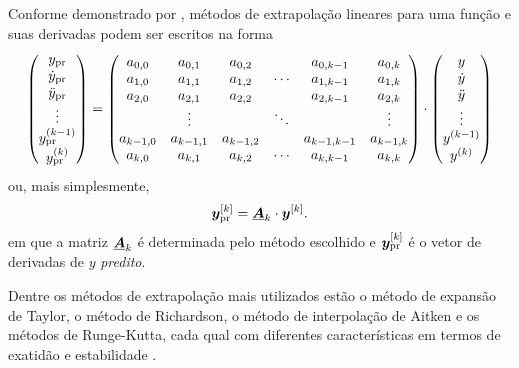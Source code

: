 Conforme demonstrado por , métodos de extrapolação lineares para uma função e suas derivadas podem ser escritos na forma
\begin{equation*}
	\begin{pmatrix}
		\predicted{y} \\
		\predicted{\deriv{1}{y}} \\
		\predicted{\deriv{2}{y}} \\
		\vdots \\
		\predicted{\deriv{\taylorOrder-1}{y}} \\
		\predicted{\deriv{\taylorOrder}{y}}
	\end{pmatrix}
	=
	\begin{pmatrix}
		a_{0,0} & a_{0,1} & a_{0,2} &  & a_{0,\taylorOrder-1} & a_{0,\taylorOrder} \\
		a_{1,0} & a_{1,1} & a_{1,2} & \cdots & a_{1,\taylorOrder-1} & a_{1,\taylorOrder} \\
		a_{2,0} & a_{2,1} & a_{2,2} &  & a_{2,\taylorOrder-1} & a_{2,\taylorOrder} \\
	     & \vdots & & \ddots & & \vdots \\
	    a_{\taylorOrder-1,0} & a_{\taylorOrder-1,1} & a_{\taylorOrder-1,2} &  & a_{\taylorOrder-1,\taylorOrder-1} & a_{\taylorOrder-1,\taylorOrder} \\
	    a_{\taylorOrder,0} & a_{\taylorOrder,1} & a_{\taylorOrder,2} & \cdots & a_{\taylorOrder,\taylorOrder-1} & a_{\taylorOrder,\taylorOrder}
	\end{pmatrix}
	\cdot
	\begin{pmatrix}
		y \\
		\deriv{1}{y} \\
		\deriv{2}{y} \\
		\vdots \\
		\deriv{\taylorOrder-1}{y} \\
		\deriv{\taylorOrder}{y}
	\end{pmatrix}
\end{equation*}
ou, mais simplesmente,
\begin{equation} \label{eq:prediction}
	\drvec{\taylorOrder}{\predicted{y}} = \extrapolationMatrix{\taylorOrder} \cdot \drvec{\taylorOrder}{y}.
\end{equation}
em que a matriz \(\underline{\bm{A}}_{k}\) é determinada pelo método escolhido e \(\drvec{\taylorOrder}{\predicted{y}}\) é o vetor de derivadas de \(y\) \textit{predito}.

Dentre os métodos de extrapolação mais utilizados estão o método de expansão de Taylor, o método de Richardson, o método de interpolação de Aitken e os métodos de Runge-Kutta, cada qual com diferentes características em termos de exatidão e estabilidade \cite{bib:gear_book}.

